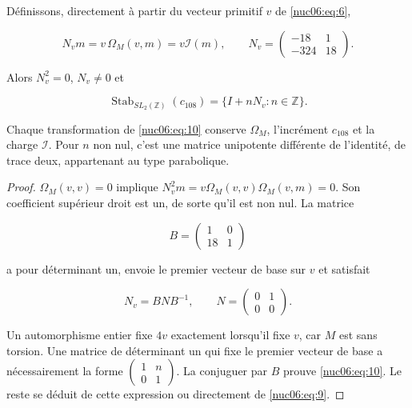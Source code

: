 \begin{theorem}

Définissons, directement à partir du vecteur primitif \(v\) de \eqref{nuc06:eq:6},

\begin{equation}
N_v m=v\,\Omega_M(v,m)=v\mathcal I(m),\qquad
N_v=\begin{pmatrix}-18&1\\-324&18\end{pmatrix}.
\label{nuc06:eq:9}
\end{equation}

Alors \(N_v^2=0\), \(N_v\ne0\) et

\begin{equation}
\boxed{\quad
\operatorname{Stab}_{SL_2(\mathbb Z)}(c_{108})
=\{I+nN_v:n\in\mathbb Z\}.
\quad}
\label{nuc06:eq:10}
\end{equation}

Chaque transformation de \eqref{nuc06:eq:10} conserve \(\Omega_M\), l’incrément \(c_{108}\) et la charge \(\mathcal I\). Pour \(n\) non nul, c’est une matrice unipotente différente de l’identité, de trace deux, appartenant au type parabolique.

\end{theorem}

\begin{proof}
\(\Omega_M(v,v)=0\) implique \(N_v^2m=v\Omega_M(v,v)\Omega_M(v,m)=0\). Son coefficient supérieur droit est un, de sorte qu’il est non nul. La matrice

\[
B=\begin{pmatrix}1&0\\18&1\end{pmatrix}
\]

a pour déterminant un, envoie le premier vecteur de base sur \(v\) et satisfait

\begin{equation}
N_v=BNB^{-1},\qquad N=\begin{pmatrix}0&1\\0&0\end{pmatrix}.
\label{nuc06:eq:11}
\end{equation}

Un automorphisme entier fixe \(4v\) exactement lorsqu’il fixe \(v\), car \(M\) est sans torsion. Une matrice de déterminant un qui fixe le premier vecteur de base a nécessairement la forme \(\begin{pmatrix}1&n\\0&1\end{pmatrix}\). La conjuguer par \(B\) prouve \eqref{nuc06:eq:10}. Le reste se déduit de cette expression ou directement de \eqref{nuc06:eq:9}.

\end{proof}

